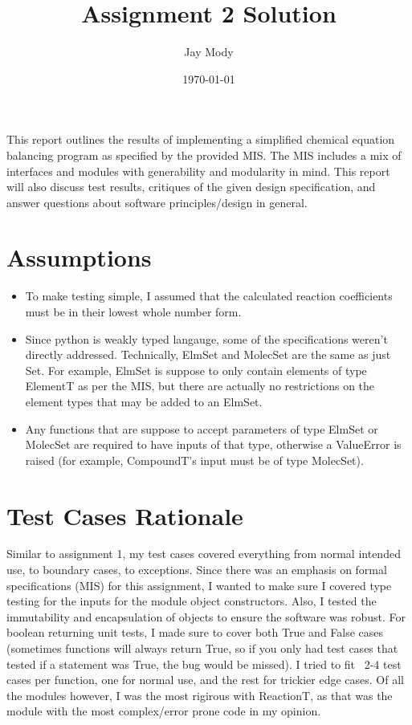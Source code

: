 \documentclass[12pt]{article}
\title{Assignment 2 Solution}
\author{Jay Mody}
\date{\today}
\begin{document}
\maketitle


This report outlines the results of implementing a simplified chemical equation balancing program as specified by the provided MIS. The MIS includes a mix of interfaces and modules with generability and modularity in mind. This report will also discuss test results, critiques of the given design specification, and answer questions about software principles/design in general.


\section{Assumptions}
\begin{itemize}
    \item To make testing simple, I assumed that the calculated reaction coefficients must be in their lowest whole number form.
    \item Since python is weakly typed langauge, some of the specifications weren't directly addressed. Technically, ElmSet and MolecSet are the same as just Set. For example, ElmSet is suppose to only contain elements of type ElementT as per the MIS, but there are actually no restrictions on the element types that may be added to an ElmSet.
    \item Any functions that are suppose to accept parameters of type ElmSet or MolecSet are required to have inputs of that type, otherwise a ValueError is raised (for example, CompoundT's input must be of type MolecSet).
\end{itemize}


\clearpage
\section{Test Cases Rationale}
Similar to assignment 1, my test cases covered everything from normal intended use, to boundary cases, to exceptions. Since there was an emphasis on formal specifications (MIS) for this assignment, I wanted to make sure I covered type testing for the inputs for the module object constructors. Also, I tested the immutability and encapsulation of objects to ensure the software was robust. For boolean returning unit tests, I made sure to cover both True and False cases (sometimes functions will always return True, so if you only had test cases that tested if a statement was True, the bug would be missed). I tried to fit ~2-4 test cases per function, one for normal use, and the rest for trickier edge cases. Of all the modules however, I was the most rigirous with ReactionT, as that was the module with the most complex/error prone code in my opinion.
\end{document}

